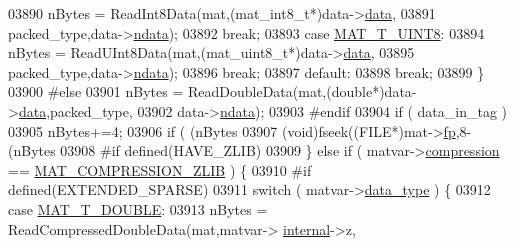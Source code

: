 \begin{DoxyCode}
{{{{{{{{{{{{{{{{{{{03890                             nBytes = ReadInt8Data(mat,(mat\_int8\_t*)data->\hyperlink{group___m_a_t_ae2c648cb9eac4ce47f26cddb44246152}{data},
03891                                 packed\_type,data->\hyperlink{group___m_a_t_a1beb8a8c58a808207cbea650563a9b63}{ndata});
03892                             \textcolor{keywordflow}{break};
03893                         \textcolor{keywordflow}{case} \hyperlink{group___m_a_t_ggacf7b3b879282b7ab3a51190e49bf3453a01c1bd7db68f90552862eb5d311be408}{MAT\_T\_UINT8}:
03894                             nBytes = ReadUInt8Data(mat,(mat\_uint8\_t*)data->\hyperlink{group___m_a_t_ae2c648cb9eac4ce47f26cddb44246152}{data},
03895                                 packed\_type,data->\hyperlink{group___m_a_t_a1beb8a8c58a808207cbea650563a9b63}{ndata});
03896                             \textcolor{keywordflow}{break};
03897                         \textcolor{keywordflow}{default}:
03898                             \textcolor{keywordflow}{break};
03899                     \}
03900 \textcolor{preprocessor}{#else}
03901                     nBytes = ReadDoubleData(mat,(\textcolor{keywordtype}{double}*)data->\hyperlink{group___m_a_t_ae2c648cb9eac4ce47f26cddb44246152}{data},packed\_type,
03902                                  data->\hyperlink{group___m_a_t_a1beb8a8c58a808207cbea650563a9b63}{ndata});
03903 \textcolor{preprocessor}{#endif}
03904                     \textcolor{keywordflow}{if} ( data\_in\_tag )
03905                         nBytes+=4;
03906                     \textcolor{keywordflow}{if} ( (nBytes %
03907                         (void)fseek((FILE*)mat->\hyperlink{struct__mat__t_a85f562e407ca9ad4d2a6e14f839432b7}{fp},8-(nBytes %
03908 \textcolor{preprocessor}{#if defined(HAVE\_ZLIB)}
03909                 \} \textcolor{keywordflow}{else} \textcolor{keywordflow}{if} ( matvar->\hyperlink{group___m_a_t_aeef0466048621cb2c959ba7f6c774d06}{compression} == 
      \hyperlink{group___m_a_t_gga768c318af97bd2567758ecb001ceb7f4a5181d2f71eab0f12f05ba65d4f13fb53}{MAT\_COMPRESSION\_ZLIB} ) \{
03910 \textcolor{preprocessor}{#if defined(EXTENDED\_SPARSE)}
03911                     \textcolor{keywordflow}{switch} ( matvar->\hyperlink{group___m_a_t_ab6aafe9bd77f0f077852593dec438144}{data\_type} ) \{
03912                         \textcolor{keywordflow}{case} \hyperlink{group___m_a_t_ggacf7b3b879282b7ab3a51190e49bf3453a31e721ecf7e188196f83c32838288797}{MAT\_T\_DOUBLE}:
03913                             nBytes = ReadCompressedDoubleData(mat,matvar->
      \hyperlink{group___m_a_t_a6e97e3ed9f40c49322c18561c2a94e92}{internal}->z,
}}}}}}}}}}}}}}}}}}}
\end{DoxyCode}
